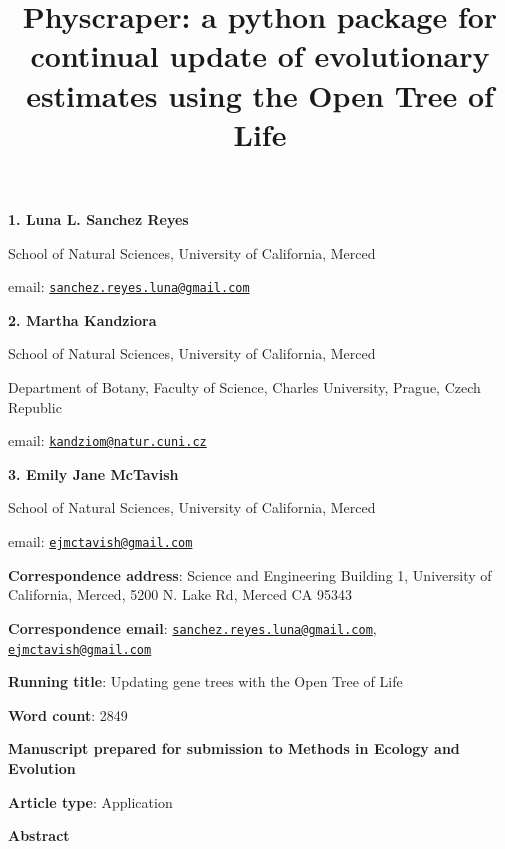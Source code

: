 \documentclass[]{article}
\title{Physcraper: a python package for continual update of evolutionary estimates using the Open Tree of Life}
\author{}
\date{\vspace{-2.5em}}
\begin{document}
\maketitle

\textbf{1. Luna L. Sanchez Reyes}

School of Natural Sciences, University of California, Merced

email: \href{mailto:sanchez.reyes.luna@gmail.com}{\nolinkurl{sanchez.reyes.luna@gmail.com}}

\textbf{2. Martha Kandziora}

School of Natural Sciences, University of California, Merced

Department of Botany, Faculty of Science, Charles University, Prague, Czech Republic

email: \href{mailto:kandziom@natur.cuni.cz}{\nolinkurl{kandziom@natur.cuni.cz}}

\textbf{3. Emily Jane McTavish}

School of Natural Sciences, University of California, Merced

email: \href{mailto:ejmctavish@gmail.com}{\nolinkurl{ejmctavish@gmail.com}}

\textbf{Correspondence address}: Science and Engineering Building 1, University of California, Merced, 5200 N. Lake Rd, Merced CA 95343

\textbf{Correspondence email}: \href{mailto:sanchez.reyes.luna@gmail.com}{\nolinkurl{sanchez.reyes.luna@gmail.com}}, \href{mailto:ejmctavish@gmail.com}{\nolinkurl{ejmctavish@gmail.com}}

\textbf{Running title}: Updating gene trees with the Open Tree of Life

\textbf{Word count}: 2849

\textbf{Manuscript prepared for submission to Methods in Ecology and Evolution}

\textbf{Article type}: Application

\newpage

\begingroup\Large

\textbf{Abstract}
\endgroup
\end{document}
